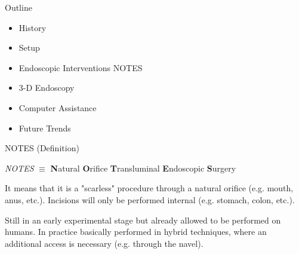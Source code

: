 \begin{frame}{Outline}
	\begin{itemize}
		\item History
		\item Setup
		\item Endoscopic Interventions
		      \bolditem NOTES
		\item 3-D Endoscopy
		\item Computer Assistance
		\item Future Trends
	\end{itemize}
\end{frame}



\begin{frame}{NOTES (Definition)}

	\begin{myDefinition}
		\begin{center}
			\textit{NOTES} $\equiv$ \textbf{N}atural \textbf{O}rifice \textbf{T}ransluminal \textbf{E}ndoscopic \textbf{S}urgery
		\end{center}

		It means that it is a "scarless" procedure through a natural orifice (e.g. mouth, anus, etc.). Incisions will only be performed internal (e.g. stomach, colon, etc.).

		Still in an early experimental stage but already allowed to be performed on humans. In practice basically performed in hybrid techniques, where an additional access is necessary (e.g. through the navel).
	\end{myDefinition}
\end{frame}






